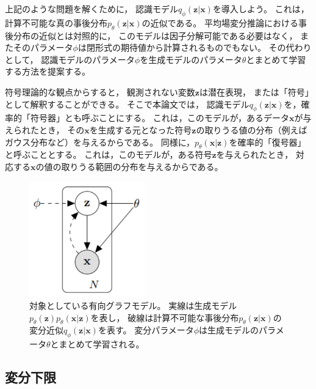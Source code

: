 \documentclass[dvipdfmx, fleqn]{jsarticle}
\begin{document}
上記のような問題を解くために，
認識モデル\(q_{\phi} (\bm{z} | \bm{x})\)を導入しよう。
これは，計算不可能な真の事後分布\(p_{\theta} (\bm{z} | \bm{x})\)の近似である。
平均場変分推論における事後分布の近似とは対照的に，
このモデルは因子分解可能である必要はなく，
またそのパラメータ\(\phi\)は閉形式の期待値から計算されるものでもない。
その代わりとして，
認識モデルのパラメータ\(\phi\)を生成モデルのパラメータ\(\theta\)とまとめて学習する方法を提案する。

符号理論的な観点からすると，
観測されない変数\(\bm{z}\)は潜在表現，
または「符号」として解釈することができる。
そこで本論文では，
認識モデル\(q_{\phi} (\bm{z} | \bm{x})\)を，確率的「符号器」とも呼ぶことにする。
これは，このモデルが，あるデータ\(\bm{x}\)が与えられたとき，
その\(\bm{x}\)を生成する元となった符号\(\bm{z}\)の取りうる値の分布（例えばガウス分布など）を与えるからである。
同様に，\(p_{\theta} (\bm{x} | \bm{z})\)を確率的「復号器」と呼ぶこととする。
これは，このモデルが，ある符号\(\bm{z}\)を与えられたとき，
対応する\(\bm{x}\)の値の取りうる範囲の分布を与えるからである。

\begin{figure}
    \centering
    \includegraphics[clip, width=5cm]{../figures/graphical_model}
    \caption{
        対象としている有向グラフモデル。
        実線は生成モデル\(p_{\theta} (\bm{z}) p_{\theta} (\bm{x} | \bm{z})\)を表し，
        破線は計算不可能な事後分布\(p_{\theta} (\bm{z} | \bm{x})\)の変分近似\(q_{\phi} (\bm{z} | \bm{x})\)を表す。
        変分パラメータ\(\phi\)は生成モデルのパラメータ\(\theta\)とまとめて学習される。
        }
    \label{fig:graphical_model}
\end{figure}



\subsection{変分下限}
\end{document}
